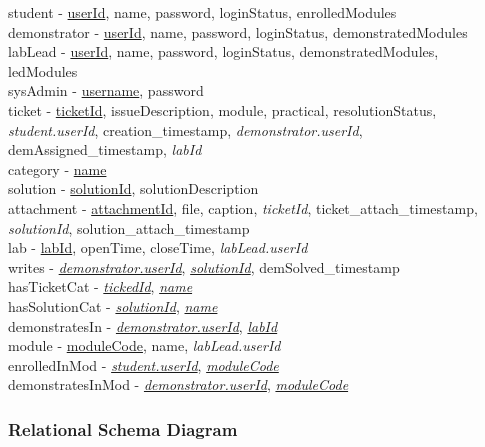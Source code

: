\noindent student - \underline{userId}, name, password, loginStatus, enrolledModules \\
demonstrator - \underline{userId}, name, password, loginStatus, demonstratedModules \\
labLead - \underline{userId}, name, password, loginStatus, demonstratedModules, ledModules \\
sysAdmin - \underline{username}, password \\
ticket - \underline{ticketId}, issueDescription, module, practical, resolutionStatus, \textit{student.userId}, creation\_timestamp, \textit{demonstrator.userId}, demAssigned\_timestamp, \textit{labId} \\
category - \underline{name} \\
solution - \underline{solutionId}, solutionDescription\\
attachment - \underline{attachmentId}, file, caption, \textit{ticketId}, ticket\_attach\_timestamp, \textit{solutionId}, solution\_attach\_timestamp\\
lab - \underline{labId}, openTime, closeTime, \textit{labLead.userId}\\
writes - \underline{\textit{demonstrator.userId}}, \underline{\textit{solutionId}}, demSolved\_timestamp\\
hasTicketCat - \underline{\textit{tickedId}}, \underline{\textit{name}}\\
hasSolutionCat - \underline{\textit{solutionId}}, \underline{\textit{name}}\\
demonstratesIn - \underline{\textit{demonstrator.userId}}, \underline{\textit{labId}}\\
module - \underline{moduleCode}, name, \textit{labLead.userId}\\
enrolledInMod - \underline{\textit{student.userId}}, \underline{\textit{moduleCode}}\\
demonstratesInMod - \underline{\textit{demonstrator.userId}}, \underline{\textit{moduleCode}}\\

\subsubsection{Relational Schema Diagram}

